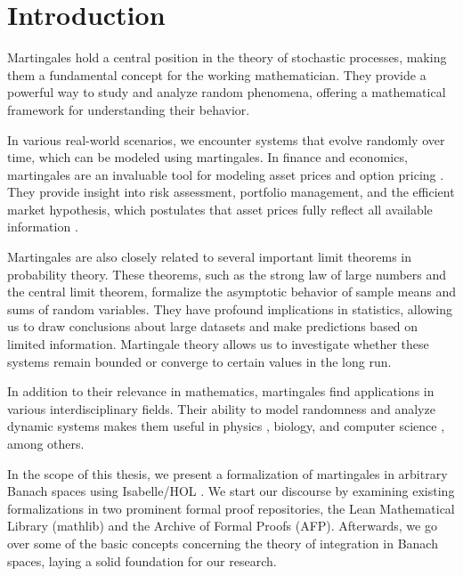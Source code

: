 ﻿%

\chapter{Introduction}\label{chapter:introduction}

Martingales hold a central position in the theory of stochastic processes, making them a fundamental concept for the working mathematician. They provide a powerful way to study and analyze random phenomena, offering a mathematical framework for understanding their behavior. 

In various real-world scenarios, we encounter systems that evolve randomly over time, which can be modeled using martingales. In finance and economics, martingales are an invaluable tool for modeling asset prices \cite{fama1965} and option pricing \cite{Musiela_Rutkowski_2005}. They provide insight into risk assessment, portfolio management, and the efficient market hypothesis, which postulates that asset prices fully reflect all available information \cite{yaes1989}. 

Martingales are also closely related to several important limit theorems in probability theory. These theorems, such as the strong law of large numbers and the central limit theorem, formalize the asymptotic behavior of sample means and sums of random variables. They have profound implications in statistics, allowing us to draw conclusions about large datasets and make predictions based on limited information. Martingale theory allows us to investigate whether these systems remain bounded or converge to certain values in the long run.

In addition to their relevance in mathematics, martingales find applications in various interdisciplinary fields. Their ability to model randomness and analyze dynamic systems makes them useful in physics \cite{roldan2023}, biology, and computer science \cite{mitzenmacher_upfal_2005}, among others.

In the scope of this thesis, we present a formalization of martingales in arbitrary Banach spaces using Isabelle/HOL \cite{Keskin_A_Formalization_of_2023}. We start our discourse by examining existing formalizations in two prominent formal proof repositories, the Lean Mathematical Library (\textsf{mathlib}) and the Archive of Formal Proofs (\textsf{AFP}). Afterwards, we go over some of the basic concepts concerning the theory of integration in Banach spaces, laying a solid foundation for our research.

